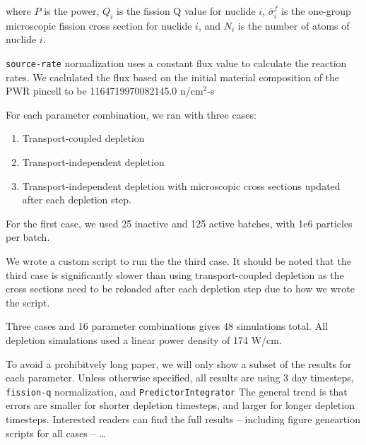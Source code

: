 \documentclass[a4paper,fleqn]{cas-dc}
\begin{document}
    where $P$ is the power, $Q_i$ is the fission Q value for nuclide $i$,
    $\bar{\sigma}_i^f$ is the one-group microscopic fission cross section for
    nuclide $i$, and $N_i$ is the number of atoms of nuclide $i$.

    \verb.source-rate. normalization uses a constant flux value to calculate the
    reaction rates. We caclulated the flux based on the initial material
    composition of the PWR pincell to be 1164719970082145.0 n/cm$^2$-s

    For each parameter combination, we ran with three cases:
    \begin{enumerate}
        \item Transport-coupled depletion
        \item Transport-independent depletion
        \item Transport-independent depletion with microscopic cross sections
            updated after each depletion step.
    \end{enumerate}

    For the first case, we used 25 inactive and 125 active batches, with 1e6
    particles per batch.

    We wrote a custom script to run the the third case. It should be noted that
    the third case is significantly slower than using transport-coupled depletion
    as the cross sections need to be reloaded after each depletion step due to how
    we wrote the script.

    Three cases and 16 parameter combinations gives 48 simulations total. All
    depletion simulations used a linear power density of 174 W/cm.

    To avoid a prohibitvely long paper, we will only show a subset of the
    results for each parameter. Unless otherwise specified, all results are
    using 3 day timesteps, \verb.fission-q. normalization, and
    \verb.PredictorIntegrator.  The general trend is that errors are smaller for
    shorter depletion timesteps, and larger for longer depletion timesteps.
    Interested readers can find the full results -- including figure geneartion
    scripts for all cases --  \ldots


\end{document}
